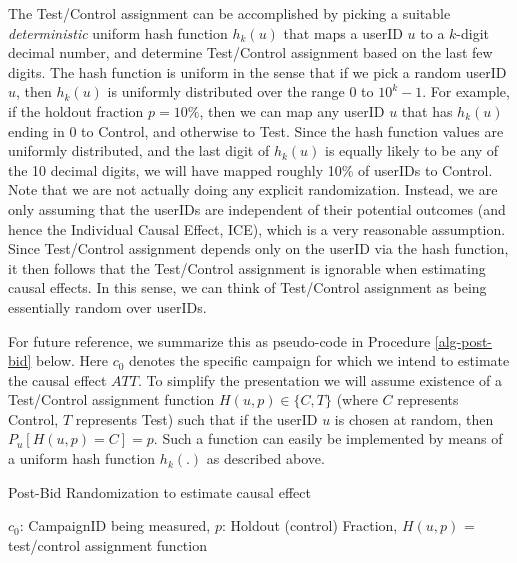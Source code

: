 \documentclass[11pt,a4paper]{article}
\theoremstyle{definition}
\theoremstyle{remark}
\theoremstyle{definition}
\theoremstyle{definition}
\theoremstyle{definition}
\theoremstyle{definition}
\theoremstyle{definition}
\theoremstyle{definition}
\begin{document}
The Test/Control assignment can be accomplished by picking a suitable {\em deterministic} uniform hash function $h_k(u)$ that maps a userID $u$ to a $k$-digit decimal number, and determine Test/Control assignment based on the last few digits. The hash function is uniform in the sense that if we pick a random userID $u$, then $h_k(u)$ is uniformly distributed over the range $0$ to $10^k-1$. For example, if the holdout fraction $p = 10\%$,  then we can map any userID $u$ that has $h_k(u)$ ending in 0 to Control, and otherwise to Test. Since the hash function values are uniformly distributed, and the last digit of $h_k(u)$ is equally likely to be any of the 10 decimal digits, we will have mapped roughly 10\% of userIDs to Control. Note that we are not actually doing any explicit randomization. Instead, we are only assuming that the userIDs are independent of their potential outcomes (and hence the Individual Causal Effect, ICE), which is a very reasonable assumption. Since Test/Control assignment depends only on the userID via the hash function, it then follows that the Test/Control assignment is ignorable when estimating causal effects. In this sense, we can think of Test/Control assignment as being essentially random over userIDs.  

For future reference, we summarize this as pseudo-code in Procedure \ref{alg-post-bid} below. Here $c_0$ denotes the specific campaign for which we intend to estimate the causal effect $ATT$. To simplify the presentation we will assume existence of a Test/Control assignment function 
$H(u,p) \in \{C,T\}$ (where $C$ represents Control, $T$ represents Test)
such that if the userID $u$ is chosen at random, then $P_u[ H(u,p) = C]= p$. Such a function can easily be implemented by means of a uniform hash function $h_k(.)$ as described above. 



\begin{algorithm} 
 \caption{Post-Bid Randomization to estimate causal effect}
    \label{alg-post-bid}
\begin{algorithmic}[1]
\Require 
$c_0$: CampaignID being measured, 
$p$: Holdout (control) Fraction,
$H(u,p)$ = test/control assignment function

 
 
     \label{phantom}
\Else    
	\EndIf
\EndIf
\EndWhile
\end{algorithmic}	
\end{algorithm}
\end{document}
